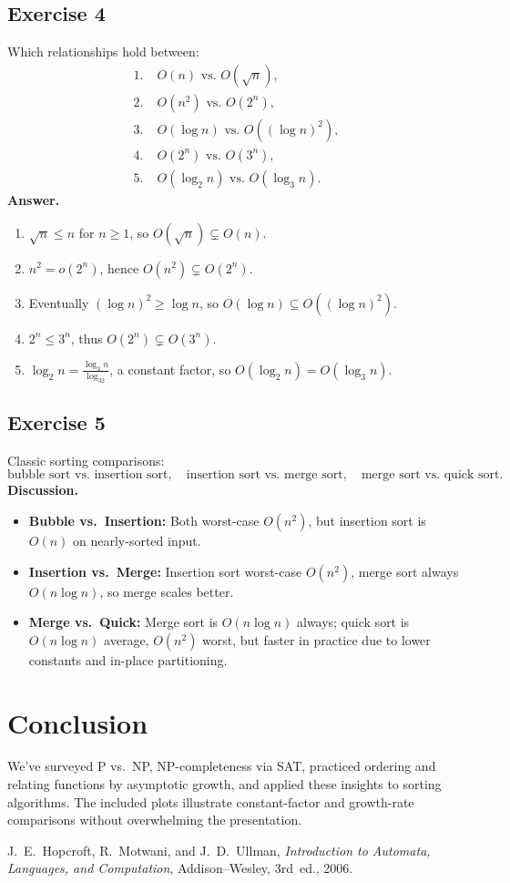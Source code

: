 \documentclass[12pt]{article}
\begin{document}
\subsection{Exercise 4}
Which relationships hold between:
\[
\begin{aligned}
1.\;&O(n)\text{ vs.\ }O(\sqrt n),\\
2.\;&O(n^2)\text{ vs.\ }O(2^n),\\
3.\;&O(\log n)\text{ vs.\ }O((\log n)^2),\\
4.\;&O(2^n)\text{ vs.\ }O(3^n),\\
5.\;&O(\log_2n)\text{ vs.\ }O(\log_3n).
\end{aligned}
\]
\textbf{Answer.}
\begin{enumerate}[label=\arabic*.]
  \item \(\sqrt n\le n\) for \(n\ge1\), so \(O(\sqrt n)\subsetneq O(n)\).
  \item \(n^2=o(2^n)\), hence \(O(n^2)\subsetneq O(2^n)\).
  \item Eventually \((\log n)^2\ge\log n\), so \(O(\log n)\subseteq O((\log n)^2)\).
  \item \(2^n\le3^n\), thus \(O(2^n)\subsetneq O(3^n)\).
  \item \(\log_2n=\tfrac{\log_3n}{\log_32}\), a constant factor, so \(O(\log_2n)=O(\log_3n)\).
\end{enumerate}

\subsection{Exercise 5}
Classic sorting comparisons:
\[
\text{bubble sort vs.\ insertion sort},\quad
\text{insertion sort vs.\ merge sort},\quad
\text{merge sort vs.\ quick sort}.
\]
\textbf{Discussion.}
\begin{itemize}
  \item \textbf{Bubble vs.\ Insertion:} Both worst-case \(O(n^2)\), but insertion sort is \(O(n)\) on nearly-sorted input.
  \item \textbf{Insertion vs.\ Merge:} Insertion sort worst-case \(O(n^2)\), merge sort always \(O(n\log n)\), so merge scales better.
  \item \textbf{Merge vs.\ Quick:} Merge sort is \(O(n\log n)\) always; quick sort is \(O(n\log n)\) average, \(O(n^2)\) worst, but faster in practice due to lower constants and in-place partitioning.
\end{itemize}

\section{Conclusion}
We’ve surveyed P vs.\ NP, NP-completeness via SAT, practiced ordering and relating functions by asymptotic growth, and applied these insights to sorting algorithms. The included plots illustrate constant-factor and growth-rate comparisons without overwhelming the presentation.

\begin{thebibliography}{9}
    J.~E.~Hopcroft, R.~Motwani, and J.~D.~Ullman,
    \textit{Introduction to Automata, Languages, and Computation},
    Addison–Wesley, 3rd~ed., 2006.
\end{thebibliography}
\end{document}
